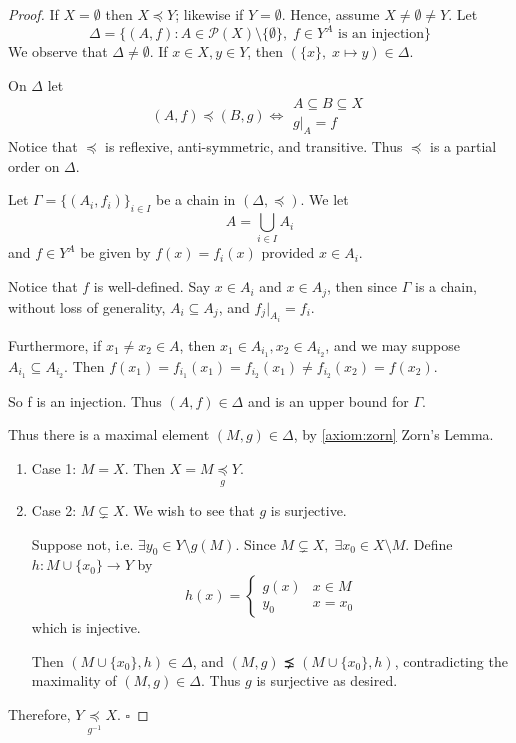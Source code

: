 \documentclass[11pt, oneside]{book}
\theoremstyle{break}
\newtheorem*{proof}{Proof}
\newcommand{\qed}{\hfill\ensuremath{\square}}	%
\begin{document}
\begin{proof}
	If $X = \emptyset$ then $X \preceq Y$; likewise if $Y = \emptyset$. Hence, assume $X \neq \emptyset \neq Y$. Let
	\begin{equation}
		\Delta = \{(A, f): A \in \mathcal{P}(X) \setminus \{\emptyset\}, \; f \in Y^A \text{ is an injection} \}
	\end{equation}
	We observe that $\Delta \neq \emptyset$. If $x \in X, y \in Y$, then $(\{x\}, \; x \mapsto y) \in \Delta$.

	On $\Delta$ let
	\begin{equation}
		(A, f) \preceq (B, g) \iff \substack{A \subseteq B \subseteq X \\ g|_A = f}
	\end{equation}
	Notice that $\preceq$ is reflexive, anti-symmetric, and transitive. Thus $\preceq$ is a partial order on $\Delta$.

	Let $\Gamma = \{(A_i, f_i)\}_{i \in I}$ be a chain in $(\Delta, \preceq)$. We let
	\begin{equation}
		A = \bigcup_{i \in I} A_i
	\end{equation}
	and $f \in Y^A$ be given by $f(x) = f_i(x)$ provided $x \in A_i$.

	Notice that $f$ is well-defined. Say $x \in A_i$ and $x \in A_j$, then since $\Gamma$ is a chain, without loss of generality, $A_i \subseteq A_j$, and $f_j|_{A_i} = f_i$. 

	Furthermore, if $x_1 \neq x_2 \in A$, then $x_1 \in A_{i_1}, x_2 \in A_{i_2}$, and we may suppose $A_{i_1} \subseteq A_{i_2}$. Then $f(x_1) = f_{i_1}(x_1) = f_{i_2}(x_1) \neq f_{i_2}(x_2) = f(x_2)$.

	So f is an injection. Thus $(A, f) \in \Delta$ and is an upper bound for $\Gamma$.

	Thus there is a maximal element $(M, g) \in \Delta$, by \autoref{axiom:zorn} Zorn's Lemma.

	\begin{enumerate}
		\item Case 1: $M = X$. Then $X = M \underset{g}{\preceq} Y$.
		\item Case 2: $M \subsetneq X$. We wish to see that $g$ is surjective.

			Suppose not, i.e. $\exists y_0 \in Y \setminus g(M)$. Since $M \subsetneq X, \; \exists x_0 \in X \setminus M$. Define $h : M \cup \{x_0\} \to Y$ by
			\begin{equation}
				h(x) =
				\begin{cases}
					g(x) & x \in M \\
					y_0 & x = x_0
				\end{cases}
			\end{equation}
			which is injective.

			Then $(M \cup \{x_0\}, h) \in \Delta$, and $(M, g) \precneq (M \cup \{x_0\}, h)$, contradicting the maximality of $(M, g) \in \Delta$. Thus $g$ is surjective as desired.
	\end{enumerate}

	Therefore, $Y \underset{g^{-1}}{\preceq} X$. \qed
\end{proof}
\end{document}
